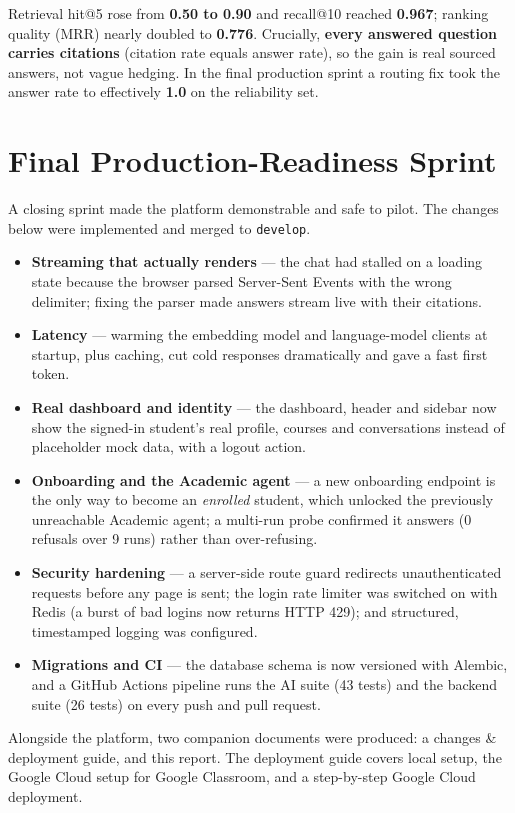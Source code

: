 \documentclass[11pt,a4paper]{article}
\begin{document}
Retrieval hit@5 rose from \textbf{0.50 to 0.90} and recall@10 reached \textbf{0.967}; ranking quality (MRR) nearly doubled to \textbf{0.776}. Crucially, \textbf{every answered question carries citations} (citation rate equals answer rate), so the gain is real sourced answers, not vague hedging. In the final production sprint a routing fix took the answer rate to effectively \textbf{1.0} on the reliability set.

\section{Final Production-Readiness Sprint}
A closing sprint made the platform demonstrable and safe to pilot. The changes below were implemented and merged to \texttt{develop}.
\begin{itemize}
\item \textbf{Streaming that actually renders} --- the chat had stalled on a loading state because the browser parsed Server-Sent Events with the wrong delimiter; fixing the parser made answers stream live with their citations.
\item \textbf{Latency} --- warming the embedding model and language-model clients at startup, plus caching, cut cold responses dramatically and gave a fast first token.
\item \textbf{Real dashboard and identity} --- the dashboard, header and sidebar now show the signed-in student's real profile, courses and conversations instead of placeholder mock data, with a logout action.
\item \textbf{Onboarding and the Academic agent} --- a new onboarding endpoint is the only way to become an \textit{enrolled} student, which unlocked the previously unreachable Academic agent; a multi-run probe confirmed it answers (0 refusals over 9 runs) rather than over-refusing.
\item \textbf{Security hardening} --- a server-side route guard redirects unauthenticated requests before any page is sent; the login rate limiter was switched on with Redis (a burst of bad logins now returns HTTP 429); and structured, timestamped logging was configured.
\item \textbf{Migrations and CI} --- the database schema is now versioned with Alembic, and a GitHub Actions pipeline runs the AI suite (43 tests) and the backend suite (26 tests) on every push and pull request.
\end{itemize}

\begin{callout}
Alongside the platform, two companion documents were produced: a changes \& deployment guide, and this report. The deployment guide covers local setup, the Google Cloud setup for Google Classroom, and a step-by-step Google Cloud deployment.
\end{callout}
\end{document}
